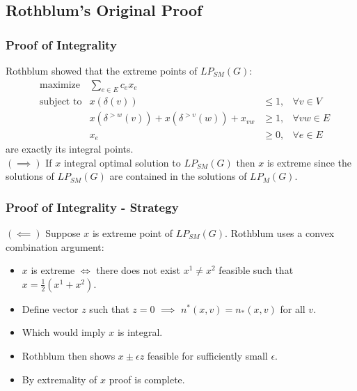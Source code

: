 \documentclass{beamer}
\begin{document}
\subsection{Rothblum's Original Proof}
\begin{frame}
\frametitle{Proof of Integrality}
Rothblum showed that the extreme points of  $LP_{SM}(G)$:
\begin{align*}
&\text{maximize} &\sum_{e \in E} c_e x_e \\
&\text{subject to} &x(\delta(v)) &\leq 1, &\forall v \in V\\
& &x(\delta^{>w}(v)) + x(\delta^{>v}(w)) + x_{vw} &\geq 1, &\forall vw \in E\\
& &x_e &\geq 0, &\forall e \in E
\end{align*}
are exactly its integral points.\\
$(\implies)$ If $x$ integral optimal solution to $LP_{SM}(G)$ then $x$ is extreme since the solutions of $LP_{SM}(G)$ are contained in the solutions of $LP_M(G)$.
\end{frame}

\begin{frame}
\frametitle{Proof of Integrality - Strategy}
$(\impliedby)$ Suppose $x$ is extreme point of $LP_{SM}(G)$. Rothblum uses a convex combination argument: 
\begin{itemize}
\item $x$ is extreme $\iff$ there does not exist $x^1 \neq x^2$ feasible such that $x = \frac{1}{2}(x^1 + x^2)$.
\item Define vector $z$ such that $z = 0$ $\implies$ $n^*(x,v) = n_*(x,v)$ for all $v$.
\item Which would imply $x$ is integral.
\item Rothblum then shows $x \pm \epsilon z$ feasible for sufficiently small $\epsilon$.
\item By extremality of $x$ proof is complete.
\end{itemize}
\end{frame}
\end{document}

